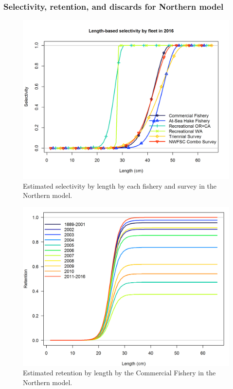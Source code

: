 \documentclass[12pt,]{article}
\begin{document}
\FloatBarrier

\newpage 

\subsubsection{Selectivity, retention, and discards for Northern
model}\label{selectivity-retention-and-discards-for-northern-model}

\begin{figure}[htbp]
\centering
\includegraphics{r4ss/plots_mod1/sel01_multiple_fleets_length1.png}
\caption{Estimated selectivity by length by each fishery and survey in
the Northern model. \label{fig:selex.N}}
\end{figure}

\begin{figure}[htbp]
\centering
\includegraphics{r4ss/plots_mod1/time-varying_retention.png}
\caption{Estimated retention by length by the Commercial Fishery in the
Northern model. \label{fig:retention.N}}
\end{figure}
\end{document}
